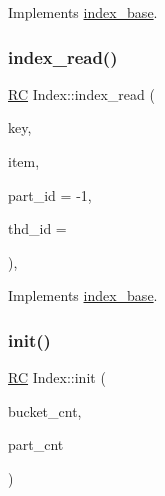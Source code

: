 Implements \hyperlink{classindex__base_ae63072105f55821091506f1a6557dd1c}{index\+\_\+base}.

\mbox{\label{classIndex_abb1666dd897887f22d8e4dc92966b207}} 
\subsubsection{\texorpdfstring{index\+\_\+read()}{index\_read()}\hspace{0.1cm}{\footnotesize\ttfamily [3/3]}}
{\footnotesize\ttfamily \hyperlink{global_8h_a78c49a674c810fdd03d20432f7be864a}{RC} Index\+::index\+\_\+read (\begin{DoxyParamCaption}\item[{\hyperlink{index__base_8h_ae35c40bc2f912c11f0e36ac66cba4489}{K\+E\+Y\+\_\+\+T\+Y\+PE}}]{key,  }\item[{\hyperlink{microbench_2main_8cpp_ae17cb099b4c9aee7835032339b5a9e0d}{V\+A\+L\+U\+E\+\_\+\+T\+Y\+PE} $\ast$}]{item,  }\item[{int}]{part\+\_\+id = {\ttfamily -\/1},  }\item[{int}]{thd\+\_\+id = {} }\end{DoxyParamCaption})\hspace{0.3cm}{\ttfamily [inline]}, {\ttfamily [virtual]}}



Implements \hyperlink{classindex__base_ae63072105f55821091506f1a6557dd1c}{index\+\_\+base}.

\mbox{\label{classIndex_a9f14dfc7c370a32604d91af76907f6c6}} 
\subsubsection{\texorpdfstring{init()}{init()}\hspace{0.1cm}{\footnotesize\ttfamily [1/3]}}
{\footnotesize\ttfamily \hyperlink{global_8h_a78c49a674c810fdd03d20432f7be864a}{RC} Index\+::init (\begin{DoxyParamCaption}\item[{uint64\+\_\+t}]{bucket\+\_\+cnt,  }\item[{int}]{part\+\_\+cnt }\end{DoxyParamCaption})}

\mbox{\label{classIndex_a92819c544e6ac6af5a2d4aa03a61a351}} 
